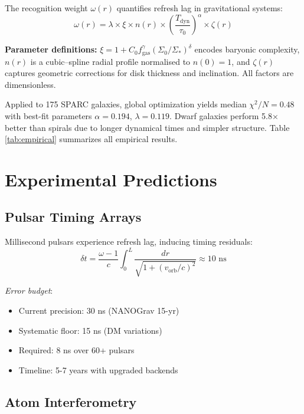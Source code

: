 \documentclass[twocolumn,prd,amsmath,amssymb,aps,superscriptaddress,nofootinbib]{revtex4-2}
\newcommand{\wrec}{\omega}  %
\begin{document}
The recognition weight $\wrec(r)$ quantifies refresh lag in gravitational systems:
\begin{equation}
\wrec(r) = \lambda \times \xi \times n(r) \times \left(\frac{T_{\text{dyn}}}{\tau_0}\right)^\alpha \times \zeta(r)
\label{eq:wrec}
\end{equation}

\textbf{Parameter definitions:} $\xi = 1 + C_0 f_{\text{gas}}^{\gamma}(\Sigma_0/\Sigma_\ast)^{\delta}$ encodes baryonic complexity, $n(r)$ is a cubic–spline radial profile normalised to $n(0)=1$, and $\zeta(r)$ captures geometric corrections for disk thickness and inclination.  All factors are dimensionless.

Applied to 175 SPARC galaxies, global optimization yields median $\chi^2/N = 0.48$ with best-fit parameters $\alpha = 0.194$, $\lambda = 0.119$. Dwarf galaxies perform 5.8× better than spirals due to longer dynamical times and simpler structure. Table \ref{tab:empirical} summarizes all empirical results.

\section{Experimental Predictions}
\label{sec:experiments}

\subsection{Pulsar Timing Arrays}

Millisecond pulsars experience refresh lag, inducing timing residuals:
\begin{equation}
\delta t = \frac{\wrec - 1}{c}\int_0^L \frac{dr}{\sqrt{1 + (v_{\text{orb}}/c)^2}} \approx 10 \text{ ns}
\end{equation}

\textit{Error budget}:
\begin{itemize}
\item Current precision: 30 ns (NANOGrav 15-yr)
\item Systematic floor: 15 ns (DM variations)  
\item Required: 8 ns over 60+ pulsars
\item Timeline: 5-7 years with upgraded backends
\end{itemize}

\subsection{Atom Interferometry}
\end{document}
